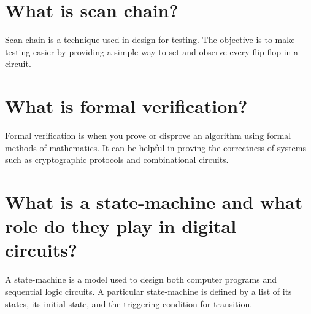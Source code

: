 \documentclass{article}
\begin{document}
\section{What is scan chain?}
Scan chain is a technique used in design for testing.
The objective is to make testing easier by providing a simple way to
set and observe every flip-flop in a circuit.

\section{What is formal verification?}
Formal verification is when you prove or disprove an algorithm using
formal methods of mathematics. It can be helpful in proving the
correctness of systems such as cryptographic protocols and
combinational circuits.

\section{What is a state-machine and what role do they play in digital
circuits?}
A state-machine is a model used to design both computer programs and
sequential logic circuits. A particular state-machine is defined by a
list of its states, its initial state, and the triggering condition
for transition.
\end{document}
